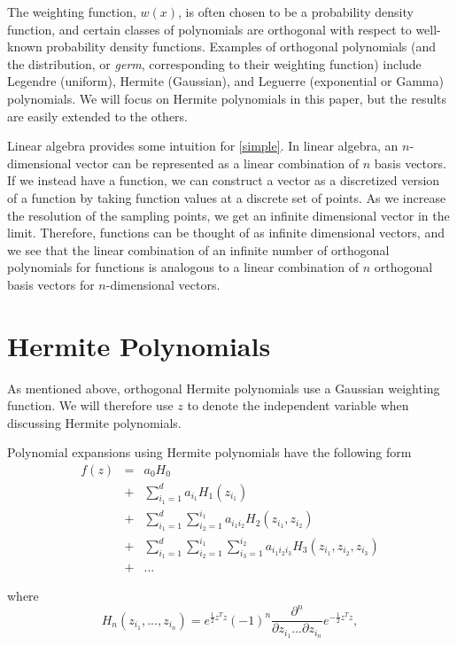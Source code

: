 \documentclass[11pt]{article}
\numberwithin{equation}{section}
\begin{document}
\qquad The weighting function, $w(x)$, is often chosen to be a probability density function, and certain classes of polynomials are orthogonal with respect to well-known probability density functions. Examples of orthogonal polynomials (and the distribution, or {\em germ}, corresponding to their weighting function) include Legendre (uniform), Hermite (Gaussian), and Leguerre (exponential or Gamma) polynomials. We will focus on Hermite polynomials in this paper, but the results are easily extended to the others. 

\qquad  Linear algebra provides some intuition for \eqref{simple}. In linear algebra, an $n$-dimensional vector can be represented as a linear combination of $n$ basis vectors. If we instead have a function, we can construct a vector as a discretized version of a function by taking function values at a discrete set of points. As we increase the resolution of the sampling points, we get an infinite dimensional vector in the limit. Therefore, functions can be thought of as infinite dimensional vectors, and we see that the linear combination of an infinite number of orthogonal polynomials for functions is analogous to a linear combination of $n$ orthogonal basis vectors for $n$-dimensional vectors. 






\section{Hermite Polynomials}

As mentioned above, orthogonal Hermite polynomials use a Gaussian weighting function. We will therefore use $z$ to denote the independent variable when discussing Hermite polynomials.

\qquad Polynomial expansions using Hermite polynomials have the following form
\begin{eqnarray}
f(z) & = & a_0 H_0 \nonumber \\
& + & \sum_{i_1 = 1}^{d} a_{i_1} H_1(z_{i_1}) \nonumber \\
& + & \sum_{i_1 = 1}^{d} \sum_{i_2 = 1}^{i_1} a_{i_1 i_2} H_2(z_{i_1}, z_{i_2}) \nonumber \\
& + & \sum_{i_1 = 1}^{d} \sum_{i_2 = 1}^{i_1} \sum_{i_3 = 1}^{i_2} a_{i_1 i_2 i_3} H_3(z_{i_1}, z_{i_2}, z_{i_3}) \nonumber \\
& + & ... \label{pce}
\end{eqnarray}

where
\begin{equation}
H_n(z_{i_1}, ..., z_{i_n}) = e^{\frac{1}{2} z^T z} (-1)^n \frac{\partial^n}{\partial z_{i_1} ... \partial z_{i_n}} e^{-\frac{1}{2} z^T z}, \label{hpoly}
\end{equation}
\end{document}
